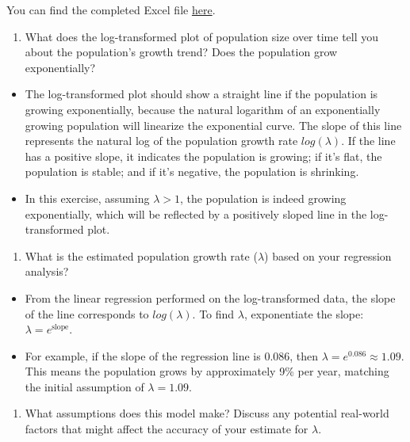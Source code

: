 \documentclass[
  a4paper]{book}
\providecommand{\tightlist}{%
  \setlength{\itemsep}{0pt}\setlength{\parskip}{0pt}}
\begin{document}
You can find the completed Excel file \href{https://www.dropbox.com/scl/fi/sxvtkuwxs0mn9ohgwh0ot/EstimatingGrowth_completed.xlsx?rlkey=lzefpmqt3ishxze4weoy9nz65&dl=1}{here}.

\begin{enumerate}
\def\labelenumi{\arabic{enumi}.}
\tightlist
\item
  What does the log-transformed plot of population size over time tell you about the population's growth trend? Does the population grow exponentially?
\end{enumerate}

\begin{itemize}
\tightlist
\item
  The log-transformed plot should show a straight line if the population is growing exponentially, because the natural logarithm of an exponentially growing population will linearize the exponential curve. The slope of this line represents the natural log of the population growth rate \(log(\lambda)\). If the line has a positive slope, it indicates the population is growing; if it's flat, the population is stable; and if it's negative, the population is shrinking.
\item
  In this exercise, assuming \(\lambda > 1\), the population is indeed growing exponentially, which will be reflected by a positively sloped line in the log-transformed plot.
\end{itemize}

\begin{enumerate}
\def\labelenumi{\arabic{enumi}.}
\setcounter{enumi}{1}
\tightlist
\item
  What is the estimated population growth rate (\(\lambda\)) based on your regression analysis?
\end{enumerate}

\begin{itemize}
\tightlist
\item
  From the linear regression performed on the log-transformed data, the slope of the line corresponds to \(log(\lambda)\). To find \(\lambda\), exponentiate the slope: \(\lambda = e^{\text{slope}}\).
\item
  For example, if the slope of the regression line is 0.086, then \(\lambda = e^{0.086} \approx 1.09\). This means the population grows by approximately 9\% per year, matching the initial assumption of \(\lambda = 1.09\).
\end{itemize}

\begin{enumerate}
\def\labelenumi{\arabic{enumi}.}
\setcounter{enumi}{2}
\tightlist
\item
  What assumptions does this model make? Discuss any potential real-world factors that might affect the accuracy of your estimate for \(\lambda\).
\end{enumerate}
\end{document}

